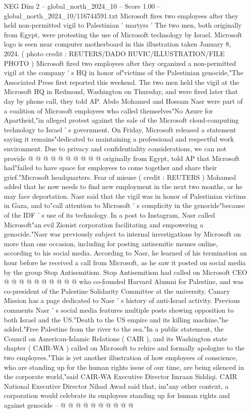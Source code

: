 \begin{textsample}{NEG Dim 2 – global\_north\_2024\_10 – Score 1.00 – global\_north\_2024\_10/116744591.txt}  \label{ex:f2_neg_104}
Microsoft fires two employees after they held non-permitted vigil to Palestinian ' martyrs ' The two men, both originally from Egypt, were protesting the use of Microsoft technology by Israel.
Microsoft logo is seen near computer motherboard in this illustration taken January 8, 2024. ( photo credit : REUTERS/DADO RUVIC/ILLUSTRATION/FILE PHOTO ) Microsoft fired two employees after they organized a non-permitted vigil at the company ' s HQ in honor of"victims of the Palestinian genocide,"The Associated Press first reported this weekend.
The two men held the vigil at the Microsoft HQ in Redmond, Washington on Thursday, and were fired later that day by phone call, they told AP.
Abdo Mohamed and Hossam Nasr were part of a coalition of Microsoft employees who called themselves"No Azure for Apartheid,"in alleged protest against the sale of the Microsoft cloud-computing technology to Israel ' s government.
On Friday, Microsoft released a statement saying it remains"dedicated to maintaining a professional and respectful work environment.
Due to privacy and confidentiality considerations, we can not provide @ @ @ @ @ @ @ @ @ @ originally from Egypt, told AP that Microsoft had"failed to have space for employees to come together and share their grief."Microsoft headquarters.
Fear of misuse ( credit : REUTERS ) Mohamed added that he now needs to find new employment in the next two months, or he may face deportation.
Nasr said that the vigil was in honor of Palestinian victims in Gaza, and to"call attention to Microsoft ' s complicity in the genocide"because of the IDF ' s use of its technology.
In a post to Instagram, Nasr called Microsoft"an evil Zionist corporation facilitating and empowering a genocide."Nasr was previously subject to internal investigations by Microsoft on more than one occasion, including for posting antisemitic memes online, according to his social media.
According to Nasr, he learned of his termination an hour before he received a call from Microsoft, as he saw it posted on social media by the group Stop Antisemitism.
Stop Antisemitism had called on Microsoft CEO @ @ @ @ @ @ @ @ @ @ who co-founded Harvard Alumni for Palestine, and was co-president of the Palestine Solidarity Committee at the university.
Canary Mission has a page dedicated to Nasr ' s history of anti-Israel activity.
Previous comments Nasr ' s social media features multiple posts showing opposition to both Israel and the US."Death to the US empire and its killing machine,"he added."Free Palestine from the river to the sea."In a public statement, the Council on American-Islamic Relations ( CAIR ), and its Washington state chapter ( CAIR-WA ) called on Microsoft to rehire and formally apologize to the two employees."This is yet another illustration of how employees of conscience, who are standing up for the human rights issue of our time, are being silenced in the corporate world,"said CAIR-WA Executive Director Imraan Siddiqi.
CAIR National Executive Director Nihad Awad said that, im"any other context, a corporation would celebrate its employees standing up for human rights and against genocide -- @ @ @ @ @ @ @ @ @ @

\end{textsample}
